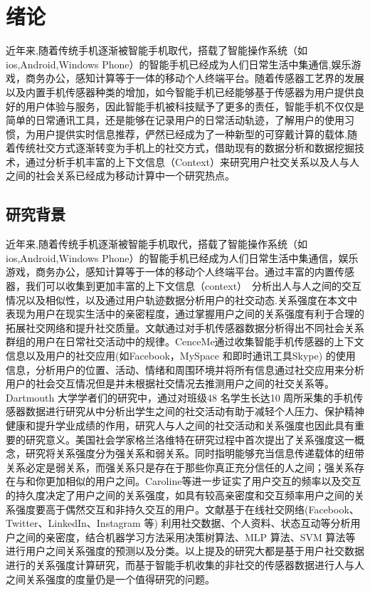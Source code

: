 \chapter{绪论}
近年来,随着传统手机逐渐被智能手机取代，搭载了智能操作系统（如ios,Android,Windows Phone）的智能手机已经成为人们日常生活中集通信,娱乐游戏，商务办公，感知计算等于一体的移动个人终端平台。随着传感器工艺界的发展以及内置手机传感器种类的增加，如今智能手机已经能够基于传感器为用户提供良好的用户体验与服务，因此智能手机被科技赋予了更多的责任，智能手机不仅仅是简单的日常通讯工具，还是能够在记录用户的日常活动轨迹，了解用户的使用习惯，为用户提供实时信息推荐，俨然已经成为了一种新型的可穿戴计算的载体,随着传统社交方式逐渐转变为手机上的社交方式，借助现有的数据分析和数据挖掘技术，通过分析手机丰富的上下文信息（Context）来研究用户社交关系以及人与人之间的社会关系已经成为移动计算中一个研究热点。

\section{研究背景}

近年来,随着传统手机逐渐被智能手机取代，搭载了智能操作系统（如ios,Android,Windows Phone）的智能手机已经成为人们日常生活中集通信，娱乐游戏，商务办公，感知计算等于一体的移动个人终端平台。通过丰富的内置传感器，我们可以收集到更加丰富的上下文信息（context）　分析出人与人之间的交互情况以及相似性，以及通过用户轨迹数据分析用户的社交动态.关系强度在本文中表现为用户在现实生活中的亲密程度，通过掌握用户之间的关系强度有利于合理的拓展社交网络和提升社交质量。文献\cite{eagle2006reality}通过对手机传感器数据分析得出不同社会关系群组的用户在日常社交活动中的规律。CenceMe通过收集智能手机传感器的上下文信息以及用户的社交应用(如Facebook，MySpace 和即时通讯工具Skype) 的使用信息，分析用户的位置、活动、情绪和周围环境并将所有信息通过社交应用来分析用户的社会交互情况但是并未根据社交情况去推测用户之间的社交关系等。Dartmouth 大学学者们的研究中，通过对班级48 名学生长达10 周所采集的手机传感器数据进行研究从中分析出学生之间的社交活动有助于减轻个人压力、保护精神健康和提升学业成绩的作用，研究人与人之间的社交活动和关系强度也因此具有重要的研究意义。美国社会学家格兰洛维特在研究过程中首次提出了关系强度这一概念，研究将关系强度分为强关系和弱关系。同时指明能够充当信息传递载体的纽带关系必定是弱关系，而强关系只是存在于那些你真正充分信任的人之间；强关系存在与和你更加相似的用户之间。Caroline等进一步证实了用户交互的频率以及交互的持久度决定了用户之间的关系强度，如具有较高亲密度和交互频率用户之间的关系强度要高于偶然交互和非持久交互的用户。文献\cite{gustafson2012extracting,khadangi2013measuring,zhao2012relationship}基于在线社交网络(Facebook、Twitter、LinkedIn、Instagram 等) 利用社交数据、个人资料、状态互动等分析用户之间的亲密度，结合机器学习方法采用决策树算法、MLP 算法、SVM 算法等进行用户之间关系强度的预测以及分类。以上提及的研究大都是基于用户社交数据进行的关系强度计算研究，而基于智能手机收集的非社交的传感器数据进行人与人之间关系强度的度量仍是一个值得研究的问题。

